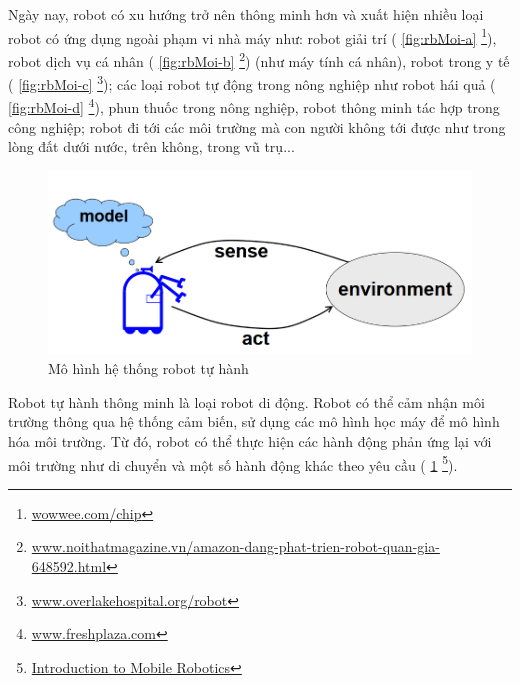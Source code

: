 Ngày nay, robot có xu hướng trở nên thông minh hơn và xuất hiện nhiều loại robot có ứng dụng ngoài phạm vi nhà máy như:
robot giải trí (\figurename{ \ref{fig:rbMoi-a}} \footnote{\url{wowwee.com/chip}}),
robot dịch vụ cá nhân (\figurename{ \ref{fig:rbMoi-b}} \footnote{\url{www.noithatmagazine.vn/amazon-dang-phat-trien-robot-quan-gia-648592.html}}) (như máy tính cá nhân), robot trong y tế (\figurename{ \ref{fig:rbMoi-c}} \footnote{\url{www.overlakehospital.org/robot}}); các loại robot tự động trong nông nghiệp như robot hái quả (\figurename{ \ref{fig:rbMoi-d}} \footnote{\href{www.freshplaza.com/article/175737/Mechanical-harvesting-robot-received-attention-at-Macfrut/}{www.freshplaza.com}}), phun thuốc trong nông nghiệp, robot thông minh tác hợp trong công nghiệp; robot đi tới các môi trường mà con người không tới được như trong lòng đất dưới nước, trên không, trong vũ trụ...

\begin{figure}[htp]
  \centering
  \includegraphics[width=12cm]{figures/c1_AutonomousRBModel.png}
  \caption{Mô hình hệ thống robot tự hành}
  \label{fig:MohinhRB}
\end{figure}


Robot tự hành thông minh là loại robot di động. Robot có thể cảm nhận môi trường thông qua hệ thống cảm biến, sử dụng các mô hình học máy để mô hình hóa môi trường. Từ đó, robot có thể thực hiện các hành động phản ứng lại với môi trường như di chuyển và một số hành động khác theo yêu cầu (\figurename{ \ref{fig:MohinhRB}} \footnote{\href{http://ais.informatik.uni-freiburg.de/teaching/ss18/robotics/slides/00-intro.pdf}{Introduction to Mobile Robotics}}).

